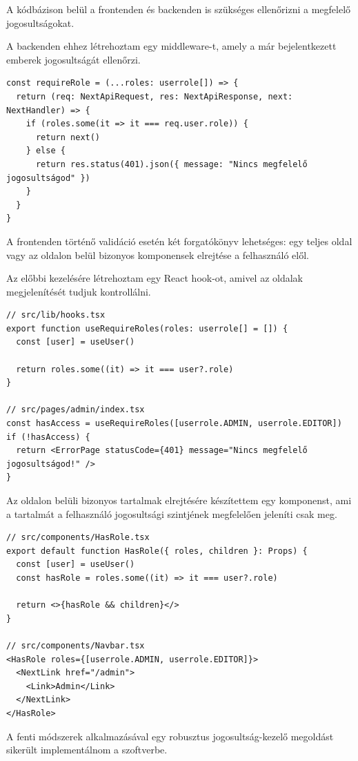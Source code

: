 A kódbázison belül a frontenden és backenden is szükséges ellenőrizni a megfelelő jogosultságokat.

A backenden ehhez létrehoztam egy middleware-t, amely a már bejelentkezett emberek jogosultságát ellenőrzi.
\begin{lstlisting}[caption=Authorizáció middleware]
const requireRole = (...roles: userrole[]) => {
  return (req: NextApiRequest, res: NextApiResponse, next: NextHandler) => {
    if (roles.some(it => it === req.user.role)) {
      return next()
    } else {
      return res.status(401).json({ message: "Nincs megfelelő jogosultságod" })
    }
  }
}
\end{lstlisting}

A frontenden történő validáció esetén két forgatókönyv lehetséges: egy teljes oldal vagy az oldalon belül bizonyos komponensek
elrejtése a felhasználó elől.

Az előbbi kezelésére létrehoztam egy React hook-ot, amivel az oldalak megjelenítését tudjuk kontrollálni.

\begin{lstlisting}[caption=Authorizációs hook és használata]
// src/lib/hooks.tsx
export function useRequireRoles(roles: userrole[] = []) {
  const [user] = useUser()

  return roles.some((it) => it === user?.role)
}

// src/pages/admin/index.tsx
const hasAccess = useRequireRoles([userrole.ADMIN, userrole.EDITOR])
if (!hasAccess) {
  return <ErrorPage statusCode={401} message="Nincs megfelelő jogosultságod!" />
}
\end{lstlisting}

Az oldalon belüli bizonyos tartalmak elrejtésére készítettem egy komponenst, ami a tartalmát a felhasználó jogosultsági szintjének
megfelelően jeleníti csak meg.

\begin{lstlisting}[caption=Authorizáció komponens és használata]
// src/components/HasRole.tsx
export default function HasRole({ roles, children }: Props) {
  const [user] = useUser()
  const hasRole = roles.some((it) => it === user?.role)

  return <>{hasRole && children}</>
}

// src/components/Navbar.tsx
<HasRole roles={[userrole.ADMIN, userrole.EDITOR]}>
  <NextLink href="/admin">
    <Link>Admin</Link>
  </NextLink>
</HasRole>
\end{lstlisting}

A fenti módszerek alkalmazásával egy robusztus jogosultság-kezelő megoldást sikerült implementálnom a szoftverbe.

